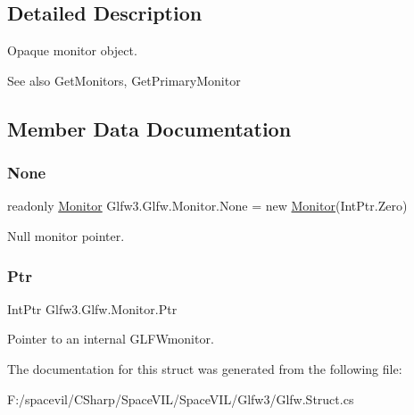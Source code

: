 \subsection{Detailed Description}


Opaque monitor object.

\begin{DoxySeeAlso}{See also}
Get\+Monitors, Get\+Primary\+Monitor


\end{DoxySeeAlso}


\subsection{Member Data Documentation}
\mbox{\label{struct_glfw3_1_1_glfw_1_1_monitor_a5183550cc653d890a7d52d054cd7ba1d}} 
\subsubsection{\texorpdfstring{None}{None}}
{\footnotesize\ttfamily readonly \mbox{\hyperlink{struct_glfw3_1_1_glfw_1_1_monitor}{Monitor}} Glfw3.\+Glfw.\+Monitor.\+None = new \mbox{\hyperlink{struct_glfw3_1_1_glfw_1_1_monitor}{Monitor}}(Int\+Ptr.\+Zero)\hspace{0.3cm}{\ttfamily [static]}}





Null monitor pointer.\mbox{\label{struct_glfw3_1_1_glfw_1_1_monitor_acc46b2a1c920a789433af0d3c7f31150}} 
\subsubsection{\texorpdfstring{Ptr}{Ptr}}
{\footnotesize\ttfamily Int\+Ptr Glfw3.\+Glfw.\+Monitor.\+Ptr}



Pointer to an internal G\+L\+F\+Wmonitor. 



The documentation for this struct was generated from the following file\+:\begin{DoxyCompactItemize}
\item 
F\+:/spacevil/\+C\+Sharp/\+Space\+V\+I\+L/\+Space\+V\+I\+L/\+Glfw3/Glfw.\+Struct.\+cs\end{DoxyCompactItemize}
